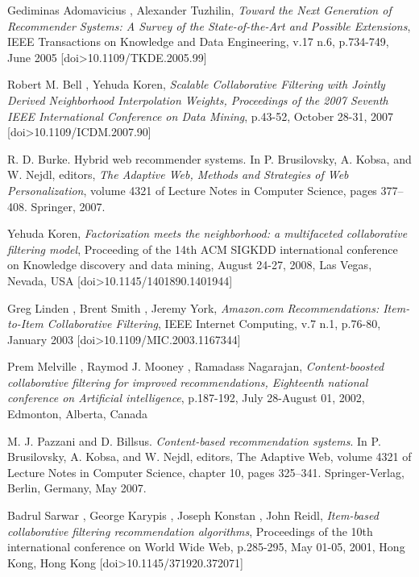 \documentclass[11pt,letterpaper]{article}
\begin{document}
\newpage
\newpage
\begin{thebibliography}{13}	
   Gediminas Adomavicius , Alexander Tuzhilin, \textit{Toward the Next Generation of Recommender Systems: A Survey of the State-of-the-Art and Possible Extensions}, IEEE Transactions on Knowledge and Data Engineering, v.17 n.6, p.734-749, June 2005  [doi>10.1109/TKDE.2005.99]

   Robert M. Bell , Yehuda Koren, \textit{Scalable Collaborative Filtering with Jointly Derived Neighborhood Interpolation Weights, Proceedings of the 2007 Seventh IEEE International Conference on Data Mining}, p.43-52, October 28-31, 2007  [doi>10.1109/ICDM.2007.90]

   R. D. Burke. Hybrid web recommender systems. In P. Brusilovsky, A. Kobsa, and W. Nejdl, editors, \textit{The Adaptive Web, Methods and Strategies of Web Personalization}, volume 4321 of Lecture Notes in Computer Science, pages 377--408. Springer, 2007.

   Yehuda Koren, \textit{Factorization meets the neighborhood: a multifaceted collaborative filtering model}, Proceeding of the 14th ACM SIGKDD international conference on Knowledge discovery and data mining, August 24-27, 2008, Las Vegas, Nevada, USA  [doi>10.1145/1401890.1401944]

   Greg Linden , Brent Smith , Jeremy York, \textit{Amazon.com Recommendations: Item-to-Item Collaborative Filtering}, IEEE Internet Computing, v.7 n.1, p.76-80, January 2003  [doi>10.1109/MIC.2003.1167344]

   Prem Melville , Raymod J. Mooney , Ramadass Nagarajan, \textit{Content-boosted collaborative filtering for improved recommendations, Eighteenth national conference on Artificial intelligence}, p.187-192, July 28-August 01, 2002, Edmonton, Alberta, Canada

   M. J. Pazzani and D. Billsus. \textit{Content-based recommendation systems}. In P. Brusilovsky, A. Kobsa, and W. Nejdl, editors, The Adaptive Web, volume 4321 of Lecture Notes in Computer Science, chapter 10, pages 325--341. Springer-Verlag, Berlin, Germany, May 2007.

   Badrul Sarwar , George Karypis , Joseph Konstan , John Reidl, \textit{Item-based collaborative filtering recommendation algorithms}, Proceedings of the 10th international conference on World Wide Web, p.285-295, May 01-05, 2001, Hong Kong, Hong Kong  [doi>10.1145/371920.372071]


\end{thebibliography}
\end{document}

